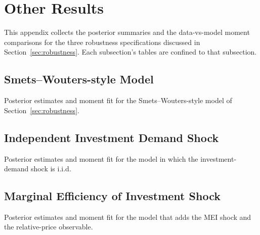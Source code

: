 \section{Other Results}
\label{app:result}

This appendix collects the posterior summaries and the data-vs-model moment
comparisons for the three robustness specifications discussed in
Section~\ref{sec:robustness}. Each subsection's tables are confined to that
subsection.

\subsection{Smets--Wouters-style Model}
\label{app:result:sw}
Posterior estimates and moment fit for the Smets--Wouters-style model of
Section~\ref{sec:robustness}.






\FloatBarrier

\subsection{Independent Investment Demand Shock}
\label{app:result:iid}
Posterior estimates and moment fit for the model in which the investment-demand
shock is i.i.d.





\FloatBarrier

\subsection{Marginal Efficiency of Investment Shock}
\label{app:result:mei}
Posterior estimates and moment fit for the model that adds the MEI shock and
the relative-price observable.





\FloatBarrier
